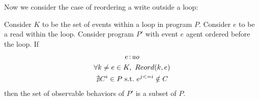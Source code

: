             Now we consider the case of reordering a write outside a loop:
            \begin{corollary}
                \label{LoopInvCodeMotWrite1}
                Consider $K$ to be the set of events within a loop in program $P$. Consider $e$ to be a read within the loop. Consider program $P'$ with event $e$ agent ordered before the loop. If
                \begin{gather*}
                    e\!:\!\textit{uo} \\
                    \forall k \neq e \in K, \ Reord(k, e) \\ 
                    \nexists C^i \in P \ \text{s.t.} \ e^{j<=i} \notin C                      
                \end{gather*}
                then the set of observable behaviors of $P'$ is a subset of $P$.

            \end{corollary}             
            
